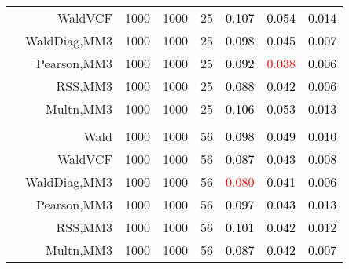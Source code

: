 \documentclass[
]{article}
\begin{document}
\begin{table}[H]
{\begin{tabular}[t]{lrrrrrrr}
\hspace{1em} & WaldVCF & 1000 & 1000 & 25 & \textcolor{black}{0.107} & \textcolor{black}{0.054} & \textcolor{black}{0.014}\\

\hspace{1em} & WaldDiag,MM3 & 1000 & 1000 & 25 & \textcolor{black}{0.098} & \textcolor{black}{0.045} & \textcolor{black}{0.007}\\

\hspace{1em} & Pearson,MM3 & 1000 & 1000 & 25 & \textcolor{black}{0.092} & \textcolor{red}{0.038} & \textcolor{black}{0.006}\\

\hspace{1em} & RSS,MM3 & 1000 & 1000 & 25 & \textcolor{black}{0.088} & \textcolor{black}{0.042} & \textcolor{black}{0.006}\\

\hspace{1em} & Multn,MM3 & 1000 & 1000 & 25 & \textcolor{black}{0.106} & \textcolor{black}{0.053} & \textcolor{black}{0.013}\\
\cmidrule{1-8}
\addlinespace[0.3em]
\multicolumn{8}{l}{\textbf{3F 15V}}\\
\hspace{1em} & Wald & 1000 & 1000 & 56 & \textcolor{black}{0.098} & \textcolor{black}{0.049} & \textcolor{black}{0.010}\\

\hspace{1em} & WaldVCF & 1000 & 1000 & 56 & \textcolor{black}{0.087} & \textcolor{black}{0.043} & \textcolor{black}{0.008}\\

\hspace{1em} & WaldDiag,MM3 & 1000 & 1000 & 56 & \textcolor{red}{0.080} & \textcolor{black}{0.041} & \textcolor{black}{0.006}\\

\hspace{1em} & Pearson,MM3 & 1000 & 1000 & 56 & \textcolor{black}{0.097} & \textcolor{black}{0.043} & \textcolor{black}{0.013}\\

\hspace{1em} & RSS,MM3 & 1000 & 1000 & 56 & \textcolor{black}{0.101} & \textcolor{black}{0.042} & \textcolor{black}{0.012}\\

\hspace{1em} & Multn,MM3 & 1000 & 1000 & 56 & \textcolor{black}{0.087} & \textcolor{black}{0.042} & \textcolor{black}{0.007}\\
\bottomrule
\end{tabular}}
\endgroup{}
\end{table}
\end{document}

